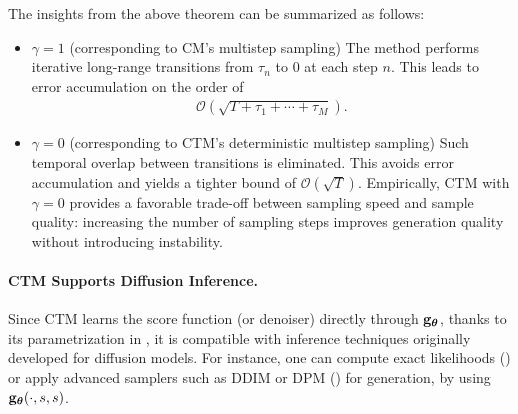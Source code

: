 The insights from the above theorem can be summarized as follows:
\begin{itemize}
    \item {} $\gamma = 1$ (corresponding to CM's multistep sampling)\textbfs{:} The method performs iterative long-range transitions from $\tau_n$ to $0$ at each step $n$. This leads to error accumulation on the order of
    \begin{align*}
        \mathcal{O}\left(\sqrt{T + \tau_1 + \cdots + \tau_M}\right).
    \end{align*}
    
    \item {} $\gamma = 0$ (corresponding to CTM's deterministic multistep sampling)\textbfs{:} Such temporal overlap between transitions is eliminated. This avoids error accumulation and yields a tighter bound of $\mathcal{O}(\sqrt{T})$. Empirically, CTM with $\gamma = 0$ provides a favorable trade-off between sampling speed and sample quality: increasing the number of sampling steps improves generation quality without introducing instability.
\end{itemize}


\paragraph{CTM Supports Diffusion Inference.} Since CTM learns the score function (or denoiser) directly through ${\mathbf{g}}_{\bm{\theta}}$, 
thanks to its parametrization in , it is compatible with inference techniques 
originally developed for diffusion models. For instance, one can compute exact likelihoods 
() or apply advanced samplers such as DDIM or DPM () 
for generation, by using ${\mathbf{g}}_{\bm{\theta}}(\cdot, s, s)$.




